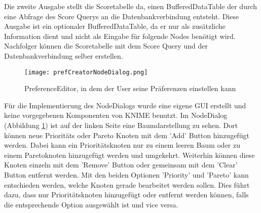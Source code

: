 Die zweite Ausgabe stellt die Scoretabelle da, einen BufferedDataTable der durch eine Abfrage des Score Querys an die Datenbankverbindung entsteht. Diese Ausgabe ist ein optionaler BufferedDataTable, da er nur als zusätzliche Information dient und nicht als Eingabe für folgende Nodes benötigt wird. Nachfolger können die Scoretabelle mit dem Score Query und der Datenbankverbindung selber erstellen.

\begin{figure}[H]
	\centering
	\texttt{[image: prefCreatorNodeDialog.png]}
	\caption{PreferenceEditor, in dem der User seine Präferenzen einstellen kann}
	\label{img:prefCreatorNodeDialog}
\end{figure}

Für die Implementierung des NodeDialogs wurde eine eigene GUI erstellt und keine vorgegebenen Komponenten von KNIME benutzt. 
Im NodeDialog (Abbildung \ref{img:prefCreatorNodeDialog}) ist auf der linken Seite eine Baumdarstellung zu sehen. Dort können neue Prioritäts oder Pareto Knoten mit dem 'Add' Button hinzugefügt werden. Dabei kann ein Prioritätsknoten nur zu einem leeren Baum oder zu einem Paretoknoten hinzugefügt werden und umgekehrt. Weiterhin können diese Knoten einzeln mit dem 'Remove' Button oder gemeinsam mit dem 'Clear' Button entfernt werden. Mit den beiden Optionen 'Priority' und 'Pareto' kann entschieden werden, welche Knoten gerade bearbeitet werden sollen. Dies führt dazu, dass nur Prioritätsknoten hinzugefügt oder entfernt werden können, falls die entsprechende Option ausgewählt ist und vice versa.

